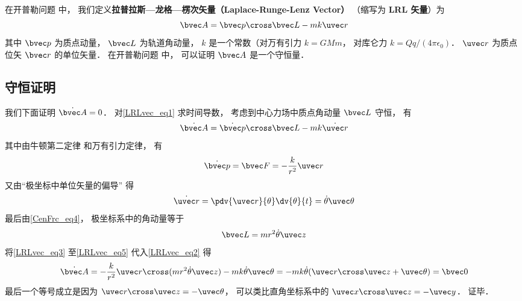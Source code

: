 

在开普勒问题%
中， 我们定义\textbf{拉普拉斯—龙格—楞次矢量（Laplace-Runge-Lenz Vector）} （缩写为 \textbf{LRL 矢量}）为
\begin{equation}\label{LRLvec_eq1}
\bvec A = \bvec p \cross \bvec L - mk \uvec r
\end{equation}
其中 $\bvec p$ 为质点动量， $\bvec L$ 为轨道角动量， $k$ 是一个常数（对万有引力 $k = GMm$， 对库仑力 $k = Qq/(4\pi\epsilon_0)$． $\uvec r$ 为质点位矢 $\bvec r$ 的单位矢量． 在开普勒问题%
中， 可以证明 $\bvec A$ 是一个守恒量．

\subsection{守恒证明}
我们下面证明 $\dot{\bvec A} = 0$． 对\autoref{LRLvec_eq1} 求时间导数， 考虑到中心力场中质点角动量 $\bvec L$ 守恒， 有
\begin{equation}\label{LRLvec_eq2}
\dot{\bvec A} = \dot{\bvec p}\cross \bvec L  - mk\dot{\uvec r}
\end{equation}
其中由牛顿第二定律 和万有引力定律， 有
\begin{equation}\label{LRLvec_eq3}
\dot{\bvec p} = \bvec F = - \frac{k}{r^2}\uvec r
\end{equation}
又由“极坐标中单位矢量的偏导” 得
\begin{equation}\label{LRLvec_eq4}
\dot{\uvec r} = \pdv{\uvec r}{\theta} \dv{\theta}{t} = \dot\theta\uvec \theta
\end{equation}
最后由\autoref{CenFrc_eq4}， 极坐标系中的角动量等于
\begin{equation}\label{LRLvec_eq5}
\bvec L = mr^2\dot \theta \uvec z
\end{equation}
将\autoref{LRLvec_eq3} 至\autoref{LRLvec_eq5} 代入\autoref{LRLvec_eq2} 得
\begin{equation}
\dot{\bvec A} = -\frac{k}{r^2}\uvec r \cross (mr^2\dot\theta\uvec z) - mk\dot\theta\uvec\theta
=-mk\dot\theta (\uvec r\cross \uvec z + \uvec \theta)
= \bvec 0
\end{equation}
最后一个等号成立是因为 $\uvec r\cross\uvec z = -\uvec\theta$， 可以类比直角坐标系中的 $\uvec x\cross\uvec z = -\uvec y$． 证毕．



